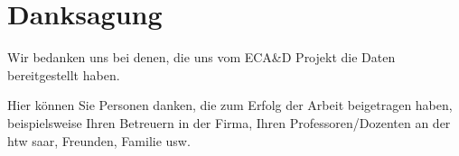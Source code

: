 
\begingroup
	\let\clearpage\relax
	\let\cleardoublepage\relax
	\let\cleardoublepage\relax
	\chapter*{Danksagung}
    
    Wir bedanken uns bei denen, die uns vom ECA\&D Projekt die Daten bereitgestellt haben. \cite{ecadWetterdaten}
    
	Hier können Sie Personen danken, die zum Erfolg der Arbeit beigetragen haben, beispielsweise Ihren Betreuern in der Firma, Ihren Professoren/Dozenten an der htw saar, Freunden, Familie usw.

\endgroup

